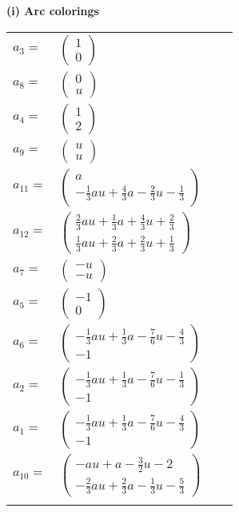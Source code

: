 \documentclass[1p]{elsarticle_modified}
\theoremstyle{definition}
\begin{document}
\flushleft \textbf{(i) Arc colorings}\\
\begin{tabular}{m{7pt} m{180pt} m{7pt} m{180pt} }
\flushright $a_{3}=$&$\begin{pmatrix}1\\0\end{pmatrix}$ \\
\flushright $a_{8}=$&$\begin{pmatrix}0\\u\end{pmatrix}$ \\
\flushright $a_{4}=$&$\begin{pmatrix}1\\2\end{pmatrix}$ \\
\flushright $a_{9}=$&$\begin{pmatrix}u\\u\end{pmatrix}$ \\
\flushright $a_{11}=$&$\begin{pmatrix}a\\-\frac{1}{3} a u+\frac{4}{3} a-\frac{2}{3} u-\frac{1}{3}\end{pmatrix}$ \\
\flushright $a_{12}=$&$\begin{pmatrix}\frac{2}{3} a u+\frac{1}{3} a+\frac{4}{3} u+\frac{2}{3}\\\frac{1}{3} a u+\frac{2}{3} a+\frac{2}{3} u+\frac{1}{3}\end{pmatrix}$ \\
\flushright $a_{7}=$&$\begin{pmatrix}- u\\- u\end{pmatrix}$ \\
\flushright $a_{5}=$&$\begin{pmatrix}-1\\0\end{pmatrix}$ \\
\flushright $a_{6}=$&$\begin{pmatrix}-\frac{1}{3} a u+\frac{1}{3} a-\frac{7}{6} u-\frac{4}{3}\\-1\end{pmatrix}$ \\
\flushright $a_{2}=$&$\begin{pmatrix}-\frac{1}{3} a u+\frac{1}{3} a-\frac{7}{6} u-\frac{1}{3}\\-1\end{pmatrix}$ \\
\flushright $a_{1}=$&$\begin{pmatrix}-\frac{1}{3} a u+\frac{1}{3} a-\frac{7}{6} u-\frac{4}{3}\\-1\end{pmatrix}$ \\
\flushright $a_{10}=$&$\begin{pmatrix}- a u+a-\frac{3}{2} u-2\\-\frac{2}{3} a u+\frac{2}{3} a-\frac{1}{3} u-\frac{5}{3}\end{pmatrix}$\\&\end{tabular}
\end{document}
